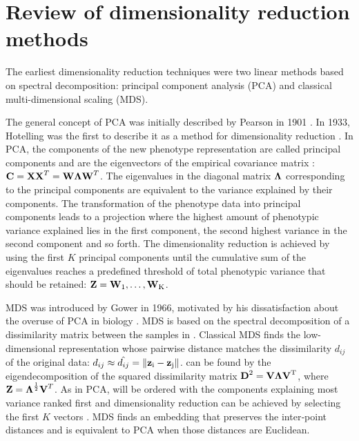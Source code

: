 \section{Review of dimensionality reduction methods}
\label{section:DimReduction-methods}
The earliest dimensionality reduction techniques were two linear methods based on spectral decomposition: principal component analysis (PCA) and classical multi-dimensional scaling (MDS). 

The general concept of PCA was initially described by Pearson in 1901 \citep{Pearson1901}. In 1933, Hotelling was the first to describe it as a method for dimensionality reduction \citep{Hoteling1933}. In PCA, the components of the new phenotype representation are called principal components and are the eigenvectors  of the empirical covariance matrix :  \(\boldsymbol{\mathbf{C}}=\boldsymbol{\mathbf{X}}\boldsymbol{\mathbf{X}}^T = \boldsymbol{\mathbf{W}}\boldsymbol{\mathbf{\Lambda}}\boldsymbol{\mathbf{W}}^T\). The eigenvalues in the diagonal matrix \(\boldsymbol{\mathbf{\Lambda}}\) corresponding to the principal components are equivalent to the variance explained by their components. The transformation of the phenotype data into principal components leads to a projection where the highest amount of phenotypic variance explained lies in the first component, the second highest variance in the second component and so forth. The dimensionality reduction is achieved by using the first \(K\) principal components until the cumulative sum of the eigenvalues reaches a predefined threshold of total phenotypic variance that should be retained: \(\boldsymbol{\mathbf{Z}}={\boldsymbol{\mathbf{W}}_\text{1}, \dots, \boldsymbol{\mathbf{W}}_\text{K}}\). 
 
MDS was introduced by Gower in 1966, motivated by his dissatisfaction about the overuse of PCA in biology  \citeyear{Gower1966}. MDS is based on the spectral decomposition of a dissimilarity matrix  between the samples in . Classical MDS finds the low-dimensional representation  whose pairwise distance matches the dissimilarity \(d_{ij}\) of the original data: \(d_{ij} \approx \hat{d_{ij}} = \lVert \boldsymbol{\mathbf{z}}_\text{i} - \boldsymbol{\mathbf{z}}_\text{j}\rVert \).  can be found by the eigendecomposition of the squared dissimilarity matrix \(\boldsymbol{\mathbf{D}}^\text{2} = \boldsymbol{\mathbf{V}}\boldsymbol{\mathbf{\Lambda}}\boldsymbol{\mathbf{V}}^\text{T}\), where \(\boldsymbol{\mathbf{Z}}=\boldsymbol{\mathbf{\Lambda}}^\frac{1}{2}\boldsymbol{\mathbf{V}}^T\). As in PCA,  will be ordered with the components explaining most variance ranked first and dimensionality reduction can be achieved by selecting the first \(K\) vectors \citep{Gower1966}. MDS finds an embedding that preserves the inter‐point distances and is equivalent to PCA when those distances are Euclidean.

